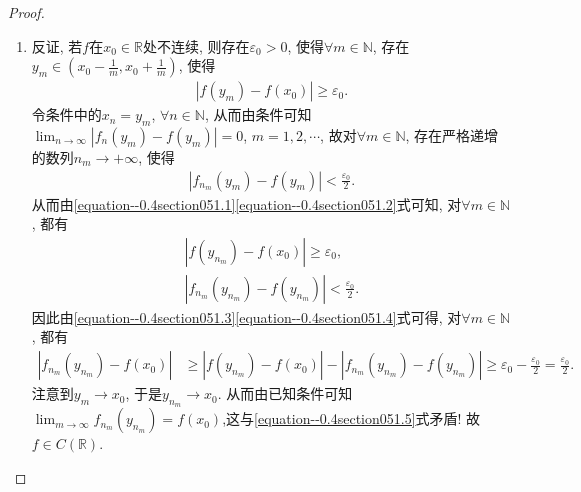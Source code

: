 \documentclass[../../main.tex]{subfiles}%
\begin{document}
\begin{proof}
\begin{enumerate}
\item 反证, 若\(f\)在\(x_0\in \mathbb{R}\)处不连续, 则存在\(\varepsilon_0 > 0\), 使得\(\forall m\in \mathbb{N}\), 存在\(y_m\in (x_0 - \frac{1}{m}, x_0 + \frac{1}{m})\), 使得
\begin{align}
|f(y_m) - f(x_0)| \geqslant \varepsilon_0. \label{equation--0.4section051.1}
\end{align}
令条件中的\(x_n= y_m\), \(\forall n\in \mathbb{N}\), 从而由条件可知\(\lim_{n\rightarrow \infty}|f_n(y_m) - f(y_m)| = 0\), \(m = 1,2,\cdots\),
故对\(\forall m\in \mathbb{N}\), 存在严格递增的数列\(n_m\rightarrow +\infty\), 使得
\begin{align}
|f_{n_m}(y_m) - f(y_m)| < \frac{\varepsilon_0}{2}. \label{equation--0.4section051.2}
\end{align}
从而由\eqref{equation--0.4section051.1}\eqref{equation--0.4section051.2}式可知, 对\(\forall m\in \mathbb{N}\), 都有
\begin{gather}
|f(y_{n_m}) - f(x_0)| \geqslant \varepsilon_0, \label{equation--0.4section051.3}\\
|f_{n_m}(y_{n_m}) - f(y_{n_m})| < \frac{\varepsilon_0}{2}. \label{equation--0.4section051.4}
\end{gather}
因此由\eqref{equation--0.4section051.3}\eqref{equation--0.4section051.4}式可得, 对\(\forall m\in \mathbb{N}\), 都有
\begin{align}
|f_{n_m}(y_{n_m}) - f(x_0)| &\geqslant |f(y_{n_m}) - f(x_0)| - |f_{n_m}(y_{n_m}) - f(y_{n_m})| \geqslant \varepsilon_0 - \frac{\varepsilon_0}{2} = \frac{\varepsilon_0}{2}. \label{equation--0.4section051.5}
\end{align}
注意到\(y_m\rightarrow x_0\), 于是\(y_{n_m}\rightarrow x_0\). 从而由已知条件可知\(\lim_{m\rightarrow \infty}f_{n_m}(y_{n_m}) = f(x_0)\),这与\eqref{equation--0.4section051.5}式矛盾! 故\(f\in C(\mathbb{R})\). 
\end{enumerate}

\end{proof}
\end{document}
